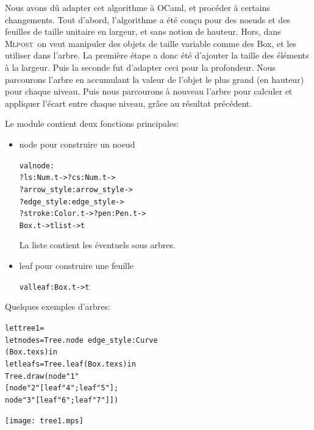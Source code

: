 \documentclass[a4paper,12pt]{article}
\newcommand{\mlpost}{\textsc{Mlpost}}
\begin{document}
Nous avons dû adapter cet algorithme à OCaml, et procéder à certains changements. Tout d'abord, l'algorithme a été conçu pour des noeuds et des feuilles de taille unitaire en largeur, et sans notion de hauteur. Hors, dans \mlpost\ on veut manipuler des objets de taille variable comme des Box, et les utiliser dans l'arbre. La première étape a donc été d'ajouter la taille des éléments à la largeur. Puis la seconde fut d'adapter ceci pour la profondeur. Nous parcourons l'arbre en accumulant la valeur de l'objet le plus grand (en hauteur) pour chaque niveau. Puis nous parcourons à nouveau l'arbre pour calculer et appliquer l'écart entre chaque niveau, grâce au résultat précédent.
\bigskip 

Le module contient deux fonctions principales:
\begin{itemize}
\item node pour construire un noeud
  \begin{alltt}
    val node : 
    ?ls:Num.t -> ?cs:Num.t -> 
    ?arrow_style:arrow_style -> 
    ?edge_style:edge_style -> 
    ?stroke:Color.t -> ?pen:Pen.t ->
    Box.t -> t list -> t
  \end{alltt}
  La liste contient les éventuels sous arbres.
\bigskip 

\item leaf pour construire une feuille
  \begin{alltt}
    val leaf : Box.t -> t
  \end{alltt}
\end{itemize}

Quelques exemples d'arbres:

\bigskip

\begin{minipage}{0.5\linewidth}
  \begin{alltt}
    let tree1 =
    let node s = Tree.node ~edge_style:Curve 
    (Box.tex s) in
    let leaf s = Tree.leaf (Box.tex s) in
    Tree.draw (node "1" 
    [node "2" [leaf "4"; leaf "5"]; 
      node "3" [leaf "6"; leaf "7"]])
  \end{alltt}
\end{minipage}
\begin{minipage}{0.5\linewidth}
  \begin{center}
    \texttt{[image: tree1.mps]}
  \end{center}
\end{minipage}

\bigskip
\end{document}
